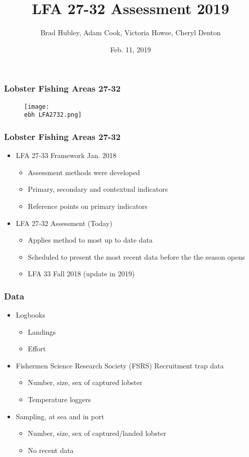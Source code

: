 \documentclass{beamer}
\title[LFA 27-32]{LFA 27-32 Assessment 2019}
\author[Hubley, Cook, Howse and Denton]{Brad Hubley, Adam Cook, Victoria Howse, Cheryl Denton}
\institute[DFO]{Science Branch, Fisheries and Oceans Canada}
\date{Feb. 11, 2019}
\newcommand{\ebh}{\string~/bio.data/bio.lobster/figures/Assessment/LFA2732/} %
\begin{document}
 
\frame{\titlepage}
 


\begin{frame}
\frametitle{Lobster Fishing Areas 27-32}
\begin{figure}
        \begin{center}
            \texttt{[image: \\ebh LFA2732.png]}
        \end{center}
    \end{figure}
\end{frame}


\begin{frame}
\frametitle{Lobster Fishing Areas 27-32}
\begin{itemize}
\setlength\itemsep{1em}    
\item LFA 27-33 Framework Jan. 2018 
\begin{itemize}
\item Assessment methods were developed
\item Primary, secondary and contextual indicators
\item Reference points on primary indicators
\end{itemize}
\item LFA 27-32 Assessment (Today)
\begin{itemize}
\item Applies method to most up to date data
\item Scheduled to present the most recent data before the the season opens
\item LFA 33 Fall 2018 (update in 2019)
\end{itemize}
\end{itemize}

\end{frame}


\begin{frame}
\frametitle{Data}
\begin{itemize}
\setlength\itemsep{1em}    
\item Logbooks 
\begin{itemize}
\item Landings
\item Effort
\end{itemize}
\item Fishermen Science Research Society (FSRS) Recruitment trap data
\begin{itemize}
\item Number, size, sex of captured lobster
\item Temperature loggers
\end{itemize}
\item Sampling, at sea and in port
\begin{itemize}
\item Number, size, sex of captured/landed lobster
\item No recent data
\end{itemize}
\end{itemize}

\end{frame}
\end{document}
